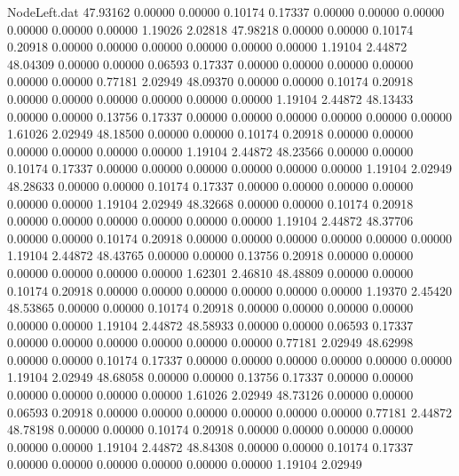 \begin{filecontents}{NodeLeft.dat}
  47.93162    0.00000    0.00000     0.10174    0.17337    0.00000    0.00000    0.00000    0.00000    0.00000    0.00000    1.19026    2.02818
  47.98218    0.00000    0.00000     0.10174    0.20918    0.00000    0.00000    0.00000    0.00000    0.00000    0.00000    1.19104    2.44872
  48.04309    0.00000    0.00000     0.06593    0.17337    0.00000    0.00000    0.00000    0.00000    0.00000    0.00000    0.77181    2.02949
  48.09370    0.00000    0.00000     0.10174    0.20918    0.00000    0.00000    0.00000    0.00000    0.00000    0.00000    1.19104    2.44872
  48.13433    0.00000    0.00000     0.13756    0.17337    0.00000    0.00000    0.00000    0.00000    0.00000    0.00000    1.61026    2.02949
  48.18500    0.00000    0.00000     0.10174    0.20918    0.00000    0.00000    0.00000    0.00000    0.00000    0.00000    1.19104    2.44872
  48.23566    0.00000    0.00000     0.10174    0.17337    0.00000    0.00000    0.00000    0.00000    0.00000    0.00000    1.19104    2.02949
  48.28633    0.00000    0.00000     0.10174    0.17337    0.00000    0.00000    0.00000    0.00000    0.00000    0.00000    1.19104    2.02949
  48.32668    0.00000    0.00000     0.10174    0.20918    0.00000    0.00000    0.00000    0.00000    0.00000    0.00000    1.19104    2.44872
  48.37706    0.00000    0.00000     0.10174    0.20918    0.00000    0.00000    0.00000    0.00000    0.00000    0.00000    1.19104    2.44872
  48.43765    0.00000    0.00000     0.13756    0.20918    0.00000    0.00000    0.00000    0.00000    0.00000    0.00000    1.62301    2.46810
  48.48809    0.00000    0.00000     0.10174    0.20918    0.00000    0.00000    0.00000    0.00000    0.00000    0.00000    1.19370    2.45420
  48.53865    0.00000    0.00000     0.10174    0.20918    0.00000    0.00000    0.00000    0.00000    0.00000    0.00000    1.19104    2.44872
  48.58933    0.00000    0.00000     0.06593    0.17337    0.00000    0.00000    0.00000    0.00000    0.00000    0.00000    0.77181    2.02949
  48.62998    0.00000    0.00000     0.10174    0.17337    0.00000    0.00000    0.00000    0.00000    0.00000    0.00000    1.19104    2.02949
  48.68058    0.00000    0.00000     0.13756    0.17337    0.00000    0.00000    0.00000    0.00000    0.00000    0.00000    1.61026    2.02949
  48.73126    0.00000    0.00000     0.06593    0.20918    0.00000    0.00000    0.00000    0.00000    0.00000    0.00000    0.77181    2.44872
  48.78198    0.00000    0.00000     0.10174    0.20918    0.00000    0.00000    0.00000    0.00000    0.00000    0.00000    1.19104    2.44872
  48.84308    0.00000    0.00000     0.10174    0.17337    0.00000    0.00000    0.00000    0.00000    0.00000    0.00000    1.19104    2.02949

\end{filecontents}
